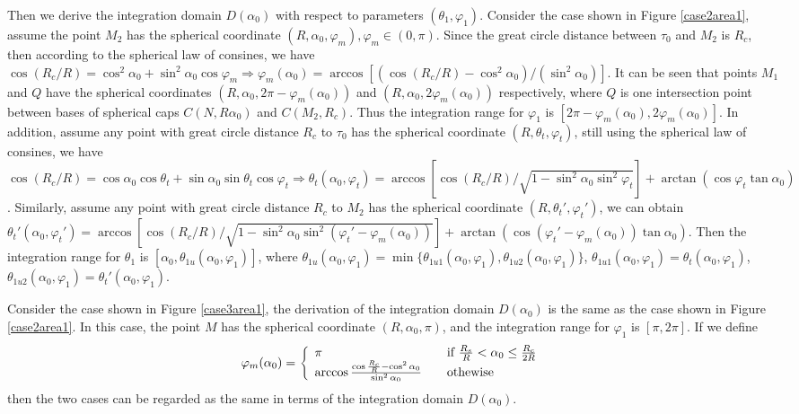\documentclass[journal, twoside]{IEEEtran}
\begin{document}
\begin{IEEEproof}
Then we derive the integration domain $D(\alpha_0)$ with respect to parameters $(\theta_1, \varphi_1)$. Consider the case shown in Figure \ref{case2area1},
assume the point $M_2$ has the spherical coordinate $(R, \alpha_0, \varphi_m), \varphi_m \in (0, \pi)$.
Since the great circle distance between $\tau_0$ and $M_2$ is $R_c$, 
then according to the spherical law of consines, we have
$\cos (R_c/R) = \cos^2 \alpha_0 + \sin ^2 \alpha_0 \cos \varphi_m 
\Rightarrow \varphi_m(\alpha_0) = \arccos [(\cos(R_c/R) - \cos^2 \alpha_0)/(\sin^2 \alpha_0)]$.
It can be seen that points $M_1$ and $Q$ have
the spherical coordinates $(R, \alpha_0, 2\pi - \varphi_m(\alpha_0))$ and
$(R, \alpha_0, 2\varphi_m(\alpha_0))$ respectively, where $Q$ is one intersection 
point between bases of spherical caps $C(N, R\alpha_0)$ and $C(M_2, R_c)$. Thus the integration
range for $\varphi_1$ is $[2\pi - \varphi_m(\alpha_0), 2\varphi_m(\alpha_0)]$.
In addition, assume any point with great circle distance $R_c$ to 
$\tau_0$ has the spherical coordinate $(R, \theta_t, \varphi_t)$,
still using the spherical law of consines, we have 
$\cos (R_c/R) = \cos \alpha_0 \cos \theta_t + \sin \alpha_0 \sin \theta_t \cos \varphi_t
\Rightarrow \theta_t(\alpha_0, \varphi_t) = \arccos [\cos(R_c/R)/\sqrt{1-\sin^2\alpha_0 \sin^2 \varphi_t}] + \arctan(\cos \varphi_t \tan \alpha_0)$.
Similarly, assume any point with great circle distance $R_c$
to $M_2$ has the spherical coordinate $(R, \theta_t', \varphi_t')$,
we can obtain $\theta_t'(\alpha_0, \varphi_t') = \arccos [\cos(R_c/R)/\sqrt{1-\sin^2\alpha_0 \sin^2 (\varphi_t' - \varphi_m(\alpha_0))}] + \arctan(\cos (\varphi_t' - \varphi_m(\alpha_0)) \tan \alpha_0)$. Then the integration range for $\theta_1$
is $[\alpha_0, \theta_{1u}(\alpha_0, \varphi_1)]$, where $\theta_{1u}(\alpha_0, \varphi_1) = \min \{\theta_{1u1}(\alpha_0, \varphi_1), \theta_{1u2}(\alpha_0, \varphi_1)\}$, $\theta_{1u1}(\alpha_0, \varphi_1) = \theta_t(\alpha_0, \varphi_1)$, $\theta_{1u2}(\alpha_0, \varphi_1) = \theta_t'(\alpha_0, \varphi_1)$.

Consider the case shown in Figure \ref{case3area1}, the derivation
of the integration domain $D(\alpha_0)$ is the same as the case shown 
in Figure \ref{case2area1}. In this case, the point $M$
has the spherical coordinate $(R, \alpha_0, \pi)$, and the integration range
for $\varphi_1$ is $[\pi, 2\pi]$. If we define
\[ \varphi_m(\alpha_0) = \left\{
  \begin{array}{l l}
    \pi & \quad \text{if $\frac{R_s}{R} < \alpha_0 \leq \frac{R_c}{2R}$}\\
    \arccos \frac{\cos\frac{R_c}{R} - \cos^2 \alpha_0}{\sin^2 \alpha_0} & \quad \text{othewise}
  \end{array} \right.\]
\noindent then the two cases can be regarded as the same in terms of the integration domain $D(\alpha_0)$.


\end{IEEEproof}
\end{document}
